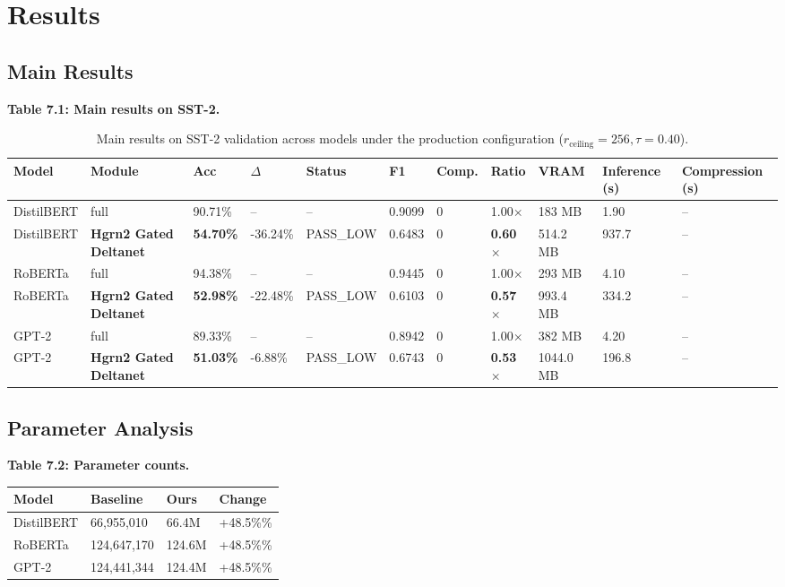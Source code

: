 \section{Results}

\subsection{Main Results}

\textbf{Table 7.1: Main results on SST-2.}

\begin{table}[t]
\centering
\small
\begin{tabular}{lllllllllll}
\toprule
\textbf{Model} & \textbf{Module} & \textbf{Acc} & \textbf{$\Delta$} & \textbf{Status} & \textbf{F1} & \textbf{Comp.} & \textbf{Ratio} & \textbf{VRAM} & \textbf{Inference (s)} & \textbf{Compression (s)} \\
\midrule
DistilBERT & full & 90.71\% & -- & -- & 0.9099 & 0 & 1.00$\times$ & 183 MB & 1.90 & -- \\
DistilBERT & \textbf{Hgrn2 Gated Deltanet} & \textbf{54.70\%} & -36.24\% & PASS\_LOW & 0.6483 & 0 & \textbf{0.60$\times$} & 514.2 MB & 937.7 & -- \\
RoBERTa & full & 94.38\% & -- & -- & 0.9445 & 0 & 1.00$\times$ & 293 MB & 4.10 & -- \\
RoBERTa & \textbf{Hgrn2 Gated Deltanet} & \textbf{52.98\%} & -22.48\% & PASS\_LOW & 0.6103 & 0 & \textbf{0.57$\times$} & 993.4 MB & 334.2 & -- \\
GPT-2 & full & 89.33\% & -- & -- & 0.8942 & 0 & 1.00$\times$ & 382 MB & 4.20 & -- \\
GPT-2 & \textbf{Hgrn2 Gated Deltanet} & \textbf{51.03\%} & -6.88\% & PASS\_LOW & 0.6743 & 0 & \textbf{0.53$\times$} & 1044.0 MB & 196.8 & -- \\
\bottomrule
\end{tabular}
\caption{Main results on SST-2 validation across models under the production configuration ($r_{\mathrm{ceiling}}=256, \tau=0.40$).}
\label{tab:main_sst2}
\end{table}

\subsection{Parameter Analysis}

\textbf{Table 7.2: Parameter counts.}

\begin{table}[H]
\centering
\small
\begin{tabular}{llll}
\toprule
\textbf{Model} & \textbf{Baseline} & \textbf{Ours} & \textbf{Change} \\
\midrule
DistilBERT & 66,955,010 & 66.4M & +48.5\%\% \\
RoBERTa & 124,647,170 & 124.6M & +48.5\%\% \\
GPT-2 & 124,441,344 & 124.4M & +48.5\%\% \\
\bottomrule
\end{tabular}
\end{table}

